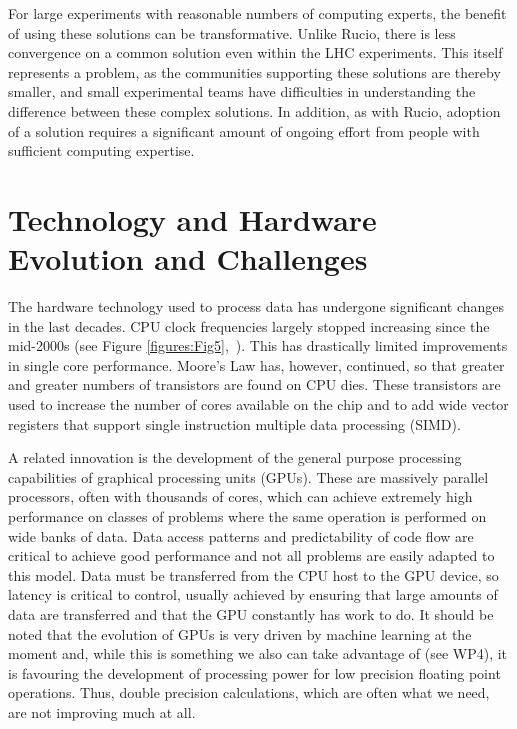 For large experiments with reasonable numbers of computing experts, the benefit of using these solutions can be transformative. Unlike Rucio, there is less convergence on a common solution even within the LHC experiments. This itself represents a problem, as the communities supporting these solutions are thereby smaller, and small experimental teams have difficulties in understanding the difference between these complex solutions. In addition, as with Rucio, adoption of a solution requires a significant amount of ongoing effort from people with sufficient computing expertise.



\section{Technology and Hardware Evolution and Challenges}


The hardware technology used to process data has undergone significant changes in the last decades. CPU clock frequencies largely stopped increasing since the mid-2000s (see Figure \ref{figures:Fig5},~\cite{KRupp_Microprocessor_Data}). This has drastically limited improvements in single core performance. Moore’s Law has, however, continued, so that greater and greater numbers of transistors are found on CPU dies. These transistors are used to increase the number of cores available on the chip and to add wide vector registers that support single instruction multiple data processing (SIMD).

A related innovation is the development of the general purpose processing capabilities of graphical processing units (GPUs). These are massively parallel processors, often with thousands of cores, which can achieve extremely high performance on classes of problems where the same operation is performed on wide banks of data. Data access patterns and predictability of code flow are critical to achieve good performance and not all problems are easily adapted to this model. Data must be transferred from the CPU host to the GPU device, so latency is critical to control, usually achieved by ensuring that large amounts of data are transferred and that the GPU constantly has work to do. It should be noted that the evolution of GPUs is very driven by machine learning at the moment and, while this is something we also can take advantage of (see WP4), it is favouring the development of processing power for low precision floating point operations. Thus, double precision calculations, which are often what we need, are not improving much at all.

